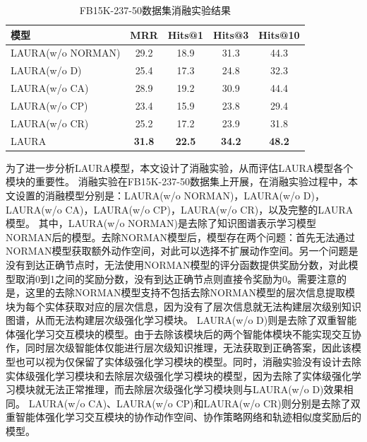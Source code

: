 \documentclass[algorithmlist, AutoFakeBold, AutoFakeSlant, figurelist, tablelist, nomlist, engineering]{seuthesix}
\begin{document}
\begin{table}[t]
  \centering
  \begin{tabular*}{0.95\textwidth}{@{\extracolsep{\fill}}lcccc}
  \toprule[1pt]
  模型 & MRR & Hits@1 & Hits@3 & Hits@10 \\ \hline
  LAURA(w/o NORMAN) & 29.2 & 18.9 & 31.3 & 44.3 \\
  LAURA(w/o D) & 25.4 & 17.3 & 24.8 & 32.3 \\
  LAURA(w/o CA) & 28.9 & 19.2 & 30.9 & 44.4 \\
  LAURA(w/o CP) & 23.4 & 15.9 & 23.8 & 29.4 \\
  LAURA(w/o CR) & 25.2 & 17.2 & 23.9 & 31.8 \\
  LAURA & \textbf{31.8} & \textbf{22.5} & \textbf{34.2} & \textbf{48.2} \\
  \bottomrule[1pt]
  \end{tabular*}
  \caption{FB15K-237-50数据集消融实验结果}
  \label{Experiment2_ablation}
\end{table}
为了进一步分析LAURA模型，本文设计了消融实验，从而评估LAURA模型各个模块的重要性。
消融实验在FB15K-237-50数据集上开展，在消融实验过程中，本文设置的消融模型分别是：LAURA(w/o NORMAN)，LAURA(w/o D)，LAURA(w/o CA)，LAURA(w/o CP)，LAURA(w/o CR)，以及完整的LAURA模型。
其中，LAURA(w/o NORMAN)是去除了知识图谱表示学习模型NORMAN后的模型。去除NORMAN模型后，模型存在两个问题：首先无法通过NORMAN模型获取额外动作空间，对此可以选择不扩展动作空间。另一个问题是没有到达正确节点时，无法使用NORMAN模型的评分函数提供奖励分数，对此模型取消0到1之间的奖励分数，没有到达正确节点则直接令奖励为0。需要注意的是，这里的去除NORMAN模型支持不包括去除NORMAN模型的层次信息提取模块为每个实体获取对应的层次信息，因为没有了层次信息就无法构建层次级别知识图谱，从而无法构建层次级强化学习模块。
LAURA(w/o D)则是去除了双重智能体强化学习交互模块的模型。由于去除该模块后的两个智能体模块不能实现交互协作，同时层次级智能体仅能进行层次级知识推理，无法获取到正确答案，因此该模型也可以视为仅保留了实体级强化学习模块的模型。同时，消融实验没有设计去除实体级强化学习模块和去除层次级强化学习模块的模型，因为去除了实体级强化学习模块就无法正常推理，而去除层次级强化学习模块则与LAURA(w/o D)效果相同。
LAURA(w/o CA)、LAURA(w/o CP)和LAURA(w/o CR)则分别是去除了双重智能体强化学习交互模块的协作动作空间、协作策略网络和轨迹相似度奖励后的模型。
\end{document}
